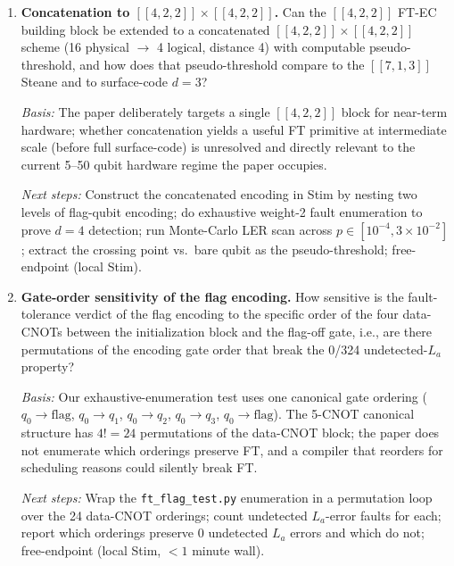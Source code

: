 \begin{enumerate}
\emph{Next steps:} Add a Kraus-channel leakage model (three-level qutrit
projection to computational subspace, ${\sim}10^{-4}$ leakage per CNOT) and
correlated $ZZ$-crosstalk term (${\sim}10^{-3}$) as post-CNOT operations
in Stim's TableauSimulator; scan $p$; refit log-log slopes; compare against
the current 2.17/1.92 baseline; free-endpoint (local Stim + numpy).

\item \textbf{Concatenation to $[\![4,2,2]\!] \times [\![4,2,2]\!]$.}
Can the $[\![4,2,2]\!]$ FT-EC building block be extended to a concatenated
$[\![4,2,2]\!]\times[\![4,2,2]\!]$ scheme
(16 physical $\rightarrow$ 4 logical, distance 4) with computable
pseudo-threshold, and how does that pseudo-threshold compare to the
$[\![7,1,3]\!]$ Steane and to surface-code $d=3$?

\emph{Basis:} The paper deliberately targets a single $[\![4,2,2]\!]$
block for near-term hardware; whether concatenation yields a useful FT
primitive at intermediate scale (before full surface-code) is unresolved
and directly relevant to the current 5--50 qubit hardware regime the paper
occupies.

\emph{Next steps:} Construct the concatenated encoding in Stim by nesting
two levels of flag-qubit encoding; do exhaustive weight-2 fault enumeration
to prove $d=4$ detection; run Monte-Carlo LER scan across
$p \in [10^{-4}, 3\!\times\!10^{-2}]$; extract the crossing point vs.\
bare qubit as the pseudo-threshold; free-endpoint (local Stim).

\item \textbf{Gate-order sensitivity of the flag encoding.}
How sensitive is the fault-tolerance verdict of the flag encoding to the
specific order of the four data-CNOTs between the initialization block and
the flag-off gate, i.e., are there permutations of the encoding gate order
that break the 0/324 undetected-$L_a$ property?

\emph{Basis:} Our exhaustive-enumeration test uses one canonical gate
ordering ($q_0\!\to\!\text{flag}$, $q_0\!\to\!q_1$, $q_0\!\to\!q_2$,
$q_0\!\to\!q_3$, $q_0\!\to\!\text{flag}$). The 5-CNOT canonical structure
has $4! = 24$ permutations of the data-CNOT block; the paper does not
enumerate which orderings preserve FT, and a compiler that reorders for
scheduling reasons could silently break FT.

\emph{Next steps:} Wrap the \texttt{ft\_flag\_test.py} enumeration in a
permutation loop over the 24 data-CNOT orderings; count undetected
$L_a$-error faults for each; report which orderings preserve 0 undetected
$L_a$ errors and which do not; free-endpoint (local Stim, ${<}1$ minute
wall).


\end{enumerate}
